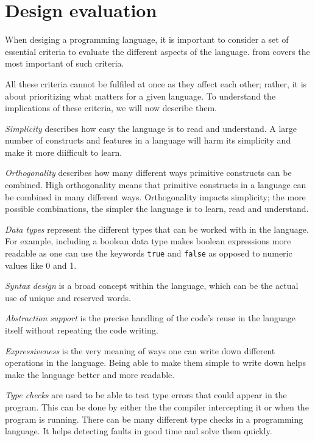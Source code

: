 \section{Design evaluation} \label{chap:design evaluation}
When desiging a programming language, it is important to consider a set of essential criteria to evaluate the different aspects of the language.
 from \cite{sebesta_concepts_2016} covers the most important of such criteria.


All these criteria cannot be fulfiled at once as they affect each other; rather, it is about prioritizing what matters for a given language. 
To understand the implications of these criteria, we will now describe them.

\textit{Simplicity} describes how easy the language is to read and understand. 
A large number of constructs and features in a language will harm its simplicity and make it more diifficult to learn.

\textit{Orthogonality} describes how many different ways primitive constructs can be combined. 
High orthogonality means that primitive constructs in a language can be combined in many different ways. 
Orthogonality impacts simplicity; the more possible combinations, the simpler the language is to learn, read and understand.

\textit{Data types} represent the different types that can be worked with in the language. 
For example, including a boolean data type makes boolean expressions more readable as one can use the keywords \texttt{true} and \texttt{false} as opposed to numeric values like 0 and 1. 

\textit{Syntax design} is a broad concept within the language, which can be the actual use of unique and reserved words.

\textit{Abstraction support} is the precise handling of the code's reuse in the language itself without repeating the code writing.

\textit{Expressiveness} is the very meaning of ways one can write down different operations in the language. Being able to make them simple to write down helps make the language better and more readable.

\textit{Type checks} are used to be able to test type errors that could appear in the program. This can be done by either the the compiler intercepting it or when the program is running. There can be many different type checks in a programming language. It helps detecting faults in good time and solve them quickly.

